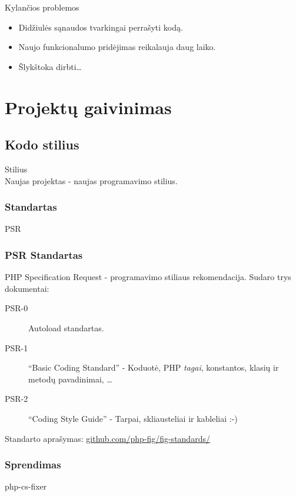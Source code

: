 \documentclass[12pt,a4paper]{beamer}
\begin{document}
\begin{frame}{Kylančios problemos}
    \begin{itemize}
        \item Didžiulės sąnaudos tvarkingai perrašyti kodą.
        \item Naujo funkcionalumo pridėjimas reikalauja daug laiko.
        \item Šlykštoka dirbti\dots
    \end{itemize}
\end{frame}

\section{Projektų gaivinimas}

\subsection{Kodo stilius}
\begin{frame}

    {\Huge Stilius}\\
    Naujas projektas - naujas programavimo stilius.
\end{frame}

\begin{frame}[fragile]
    \frametitle{Standartas}

    {\Huge PSR}
\end{frame}

\begin{frame}
    \frametitle{PSR Standartas}
    {\large PHP Specification Request - programavimo stiliaus rekomendacija.}
    \vskip15pt
    \pause
    Sudaro trys dokumentai:
    \begin{description}
        \item[PSR-0] Autoload standartas.
        \pause
        \item[PSR-1] ``Basic Coding Standard'' - Koduotė, PHP \textit{tagai}, konstantos, klasių ir metodų pavadinimai, \dots
        \pause
        \item[PSR-2] ``Coding Style Guide'' - Tarpai, skliausteliai ir kableliai :-)
        \pause
    \end{description}
    \vskip10pt
    {\small Standarto aprašymas: \href{https://github.com/php-fig/fig-standards/}{github.com/php-fig/fig-standards/}}
\end{frame}

\begin{frame}[fragile]
    \frametitle{Sprendimas}

    {\Huge php-cs-fixer}
\end{frame}
\end{document}
